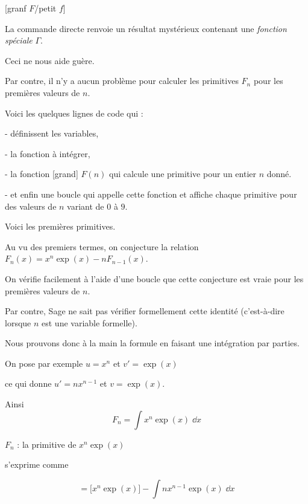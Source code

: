 \diapo

[granf $F$/petit $f$]


\change
La commande directe 
  renvoie un résultat mystérieux contenant une \emph{fonction spéciale} $\Gamma$.  

Ceci ne nous aide guère.%

\change

Par contre, il n'y a aucun problème pour calculer les primitives $F_n$ 
  pour les premières valeurs de $n$. 
  
Voici les quelques lignes de code qui :

- définissent les variables,

- la fonction à intégrer,

- la fonction [grand] $F(n)$ qui calcule une primitive pour un entier $n$ donné.

- et enfin une boucle qui appelle cette fonction et affiche chaque primitive
pour des valeurs de $n$ variant de $0$ à $9$.

\change

Voici les premières primitives.

\diapo

\change

Au vu des premiers termes, on conjecture la relation 
$F_n(x) = x^n \exp(x) - nF_{n-1}(x)$.

On vérifie facilement à l'aide d'une boucle que cette conjecture 
est vraie pour les premières valeurs de $n$.

\change    
    Par contre, Sage ne sait pas vérifier formellement cette identité 
    (c'est-à-dire lorsque $n$ est une variable formelle).

\change
Nous prouvons donc à la main la formule en faisant une intégration par parties.


On pose par exemple $u=x^n$ et $v'=\exp(x)$ 

ce qui donne $u'=nx^{n-1}$ et $v = \exp(x)$.

\change
Ainsi     
    $$   F_n =  \int x^n \exp(x)\; \dd x$$
    \begin{center}
      $F_n$ : la primitive de $x^n \exp(x)$
    \end{center}
\change 
    \begin{center}
      s'exprime comme
    \end{center}
   $$ = \big[x^n\exp(x)\big] - \int nx^{n-1}\exp(x)\; \dd x$$
   
